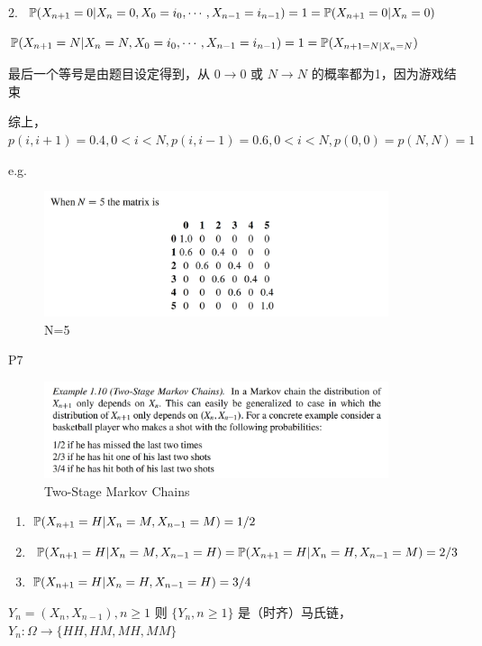 2. $\mathbb{P}(X_{n+1}=0|X_n=0,X_0=i_0,\cdots,X_{n-1}=i_{n-1})=1=\mathbb{P}(X_{n+1}=0|X_n=0)$

$\mathbb{P}(X_{n+1}=N|X_n=N, X_0=i_0,\cdots, X_{n-1}=i_{n-1})=1=\mathbb{P}(X_{n+1=N|X_n=N})$

最后一个等号是由题目设定得到，从 $0\to 0$ 或 $N\to N$ 的概率都为1，因为游戏结束

综上，$p(i,i+1)=0.4,0<i<N, p(i,i-1)=0.6, 0<i<N, p(0,0)=p(N,N)=1$

e.g. 

\begin{figure}[H]
    \centering
    \includegraphics[width=0.9\textwidth]{figures/N=5.png}
    \caption{N=5}
\end{figure}

\begin{example} P7
    \begin{figure}[H]
        \centering
        \includegraphics[width=0.9\textwidth]{figures/two_stage_markov_chains.png}
        \caption{Two-Stage Markov Chains}
    \end{figure}
\end{example}

\begin{enumerate}
    \item $\mathbb{P}(X_{n+1}=H|X_n=M,X_{n-1}=M)=1/2$
    \item $\mathbb{P}(X_{n+1}=H|X_n=M,X_{n-1}=H)=\mathbb{P}(X_{n+1}=H|X_n=H,X_{n-1}=M)=2/3$
    \item $\mathbb{P}(X_{n+1}=H|X_n=H,X_{n-1}=H)=3/4$
\end{enumerate}

\begin{claim}
$Y_n=(X_n,X_{n-1}), n\geq 1$ 则 $\{Y_n,n\geq 1\}$ 是（时齐）马氏链，$Y_n:\Omega\to \{HH,HM,MH,MM\}$ 
\end{claim}

